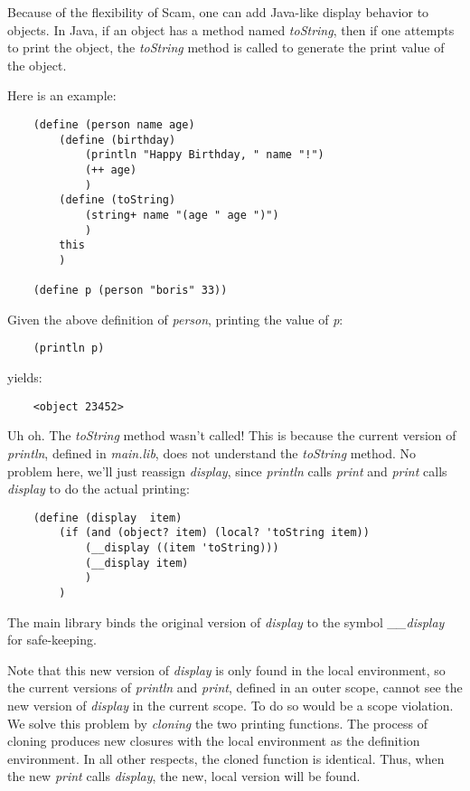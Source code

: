 Because of the flexibility of Scam, one can
add Java-like display behavior to objects.
In Java, if an object has a method named {\it toString},
then if one attempts to print the object, the {\it toString}
method is called to generate the print value of the object.

Here is an example:

\begin{verbatim}
    (define (person name age)
        (define (birthday)
            (println "Happy Birthday, " name "!")
            (++ age)
            )
        (define (toString)
            (string+ name "(age " age ")")
            )
        this
        )

    (define p (person "boris" 33))
\end{verbatim}

Given the above definition of {\it person}, printing the value of {\it p}:

\begin{verbatim}
    (println p)
\end{verbatim}

yields:

\begin{verbatim}
    <object 23452>
\end{verbatim}

Uh oh. The {\it toString} method wasn't called! This is because
the current version of {\it println}, defined in {\it main.lib},
does not understand the {\it toString}
method. No problem here, we'll just reassign {\it display},
since {\it println} calls {\it print} and {\it print} calls {\it display}
to do the actual printing:

\begin{verbatim}
    (define (display  item)
        (if (and (object? item) (local? 'toString item))
            (__display ((item 'toString)))
            (__display item)
            )
        )
\end{verbatim}

The main library binds the original version of {\it display}
to the symbol {\it \_\_display} for
safe-keeping.

Note that this new version of {\it display} is only found in the local
environment, so the current versions of {\it println} and {\it print}, defined
in an outer scope, cannot see the new version of {\it display} in the current
scope.
To do so would be a scope violation.
We solve this problem by {\it cloning} the two printing functions.
The process of cloning produces new closures with 
the local environment as the definition environment.
In all other respects, the cloned function is identical.
Thus, when the new {\it print} calls {\it display}, the new, local version 
will be found.

